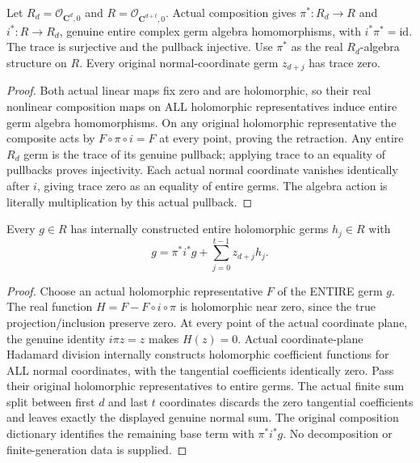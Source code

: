 \begin{lemma}
\label{hir:relative-normal-entire-germ-retraction}
\leanok
Let $R_d=\mathcal O_{\mathbf C^d,0}$ and $R=\mathcal O_{\mathbf C^{d+t},0}$.
Actual composition gives $\pi^*:R_d\to R$ and $i^*:R\to R_d$, genuine entire
complex germ algebra homomorphisms, with $i^*\pi^*=\mathrm{id}$. The trace is
surjective and the pullback injective. Use $\pi^*$ as the real $R_d$-algebra
structure on $R$. Every original normal-coordinate germ $z_{d+j}$ has trace zero.
\end{lemma}
\begin{proof}
Both actual linear maps fix zero and are holomorphic, so their real nonlinear
composition maps on ALL holomorphic representatives induce entire germ algebra
homomorphisms. On any original holomorphic representative the composite acts
by $F\circ\pi\circ i=F$ at every point, proving the retraction. Any entire
$R_d$ germ is the trace of its genuine pullback; applying trace to an equality
of pullbacks proves injectivity. Each actual normal coordinate vanishes
identically after $i$, giving trace zero as an equality of entire germs.
The algebra action is literally multiplication by this actual pullback.
\end{proof}

\begin{lemma}
\label{hir:relative-normal-whole-hadamard}
\leanok
Every $g\in R$ has internally constructed entire holomorphic germs $h_j\in R$
with
\[
 g=\pi^*i^*g+\sum_{j=0}^{t-1}z_{d+j}h_j.
\]
\end{lemma}
\begin{proof}
Choose an actual holomorphic representative $F$ of the ENTIRE germ $g$. The
real function $H=F-F\circ i\circ\pi$ is holomorphic near zero, since the true
projection/inclusion preserve zero. At every point of the actual coordinate
plane, the genuine identity $i\pi z=z$ makes $H(z)=0$. Actual coordinate-plane
Hadamard division internally constructs holomorphic coefficient functions for
ALL normal coordinates, with the tangential coefficients identically zero.
Pass their original holomorphic representatives to entire germs. The actual
finite sum split between first $d$ and last $t$ coordinates discards the zero
tangential coefficients and leaves exactly the displayed genuine normal sum.
The original composition dictionary identifies the remaining base term with
$\pi^*i^*g$. No decomposition or finite-generation data is supplied.
\end{proof}

